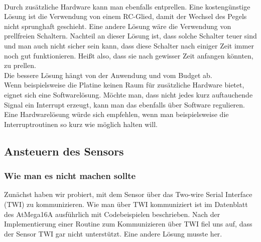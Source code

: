 \documentclass[]{article}
\begin{document}
\\Durch zusätzliche Hardware kann man ebenfalls entprellen. Eine kostengünstige Lösung ist die Verwendung von einem RC-Glied, damit der Wechsel des Pegels nicht sprunghaft geschieht. Eine andere Lösung wäre die Verwendung von prellfreien Schaltern. Nachteil an dieser Lösung ist, dass solche Schalter teuer sind und man auch nicht sicher sein kann, dass diese Schalter nach einiger Zeit immer noch gut funktionieren. Heißt also, dass sie nach gewisser Zeit anfangen könnten, zu prellen.
\\Die bessere Lösung hängt von der Anwendung und vom Budget ab. 
\\Wenn beispielsweise die Platine keinen Raum für zusätzliche Hardware bietet, eignet sich eine Softwarelösung. Möchte man, dass nicht jedes kurz auftauchende Signal ein Interrupt erzeugt, kann man das ebenfalls über Software regulieren. 
\\Eine Hardwarelösung würde sich empfehlen, wenn man beispielsweise die Interruptroutinen so kurz wie möglich halten will. 

\subsection{Ansteuern des Sensors}
\subsubsection{Wie man es nicht machen sollte}
Zunächst haben wir probiert, mit dem Sensor über das Two-wire Serial Interface (TWI) zu kommunizieren. Wie man über TWI kommuniziert ist im Datenblatt des AtMega16A ausführlich mit Codebeispielen beschrieben. Nach der Implementierung einer Routine zum Kommunizieren über TWI fiel uns auf, dass der Sensor TWI gar nicht unterstützt. Eine andere Lösung musste her.
\end{document}
